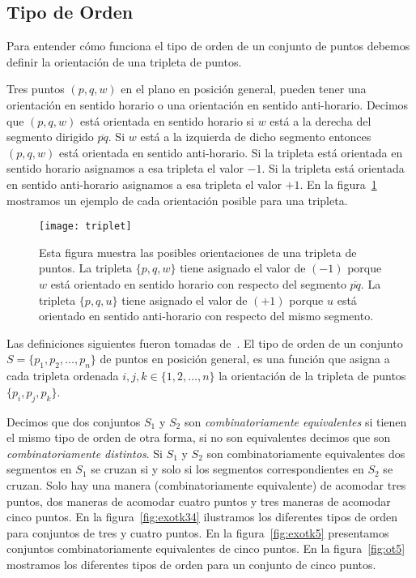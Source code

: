 \subsection{Tipo de Orden}

Para entender cómo funciona el tipo de orden de un conjunto de puntos
debemos definir la orientación de una tripleta de puntos.

Tres puntos $(p,q,w)$ en el plano en posición general, pueden tener una
orientación en sentido horario o una orientación en sentido anti-horario.
Decimos que $(p,q,w)$ está orientada en sentido horario si $w$ está a la
derecha del segmento dirigido $\overline{pq}$. Si $w$ está a la izquierda
de dicho segmento entonces $(p,q,w)$ está orientada en sentido anti-horario.
Si la tripleta está orientada en sentido horario asignamos a esa tripleta el
valor $-1$. Si la tripleta está orientada en sentido anti-horario asignamos a
esa tripleta el valor $+1$. En la figura~\ref{fig:triplet} mostramos un ejemplo
de cada orientación posible para una tripleta.
\begin{figure}[htpb]
  \centering
  \texttt{[image: triplet]}
  \caption{Esta figura muestra las posibles orientaciones de una tripleta de
  puntos. La tripleta $\{p,q,w\}$ tiene asignado el valor de $(-1)$ porque $w$
  está orientado en sentido horario con respecto del segmento $\overline{pq}$.
  La tripleta $\{p,q,u\}$ tiene asignado el valor de $(+1)$  porque $u$ está
  orientado en sentido anti-horario con respecto del mismo segmento.}
  \label{fig:triplet}
\end{figure}

Las definiciones siguientes fueron tomadas de~\cite{Aichholzer2002}.
El tipo de orden de un conjunto $S=\{p_1,p_2,\dots,p_n\}$ de puntos en posición
general, es una función que asigna a cada tripleta ordenada
$i,j,k \in \{1,2,\dots,n\}$ la orientación de la tripleta de puntos
$\{p_i,p_j,p_k\}$.

Decimos que dos conjuntos $S_1$ y $S_2$ son \emph{combinatoriamente
equivalentes} si tienen el mismo tipo de orden de otra forma, si no son
equivalentes decimos que son \emph{combinatoriamente distintos}. Si $S_1$ y
$S_2$ son combinatoriamente equivalentes dos segmentos en $S_1$ se cruzan si y
solo si los segmentos correspondientes en $S_2$ se cruzan. Solo hay una manera
(combinatoriamente equivalente) de acomodar tres puntos,
dos maneras de acomodar cuatro puntos y tres maneras de acomodar cinco puntos.
En la figura~\ref{fig:exotk34} ilustramos los diferentes tipos de orden
para conjuntos de tres y cuatro puntos. En la figura~\ref{fig:exotk5}
presentamos conjuntos combinatoriamente equivalentes de cinco puntos. En la
figura~\ref{fig:ot5} mostramos los diferentes tipos de orden para un conjunto
de cinco puntos.

